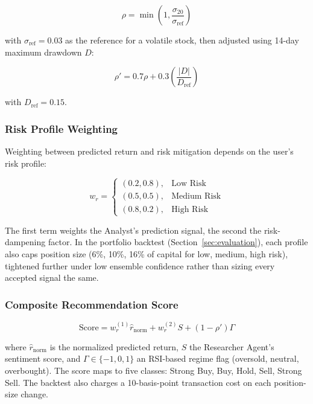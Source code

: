 \documentclass[conference]{IEEEtran}
\begin{document}
\begin{equation}
\rho = \min\left(1, \frac{\sigma_{20}}{\sigma_{\mathrm{ref}}}\right)
\end{equation}

with $\sigma_{\mathrm{ref}}=0.03$ as the reference for a volatile stock, then adjusted using 14-day maximum drawdown $D$:

\begin{equation}
\rho' = 0.7\rho + 0.3\left(\frac{|D|}{D_{\mathrm{ref}}}\right)
\end{equation}

with $D_{\mathrm{ref}}=0.15$.

\subsubsection{Risk Profile Weighting}

Weighting between predicted return and risk mitigation depends on the user's risk profile:

\[
w_r =
\begin{cases}
(0.2, 0.8), & \text{Low Risk} \\
(0.5, 0.5), & \text{Medium Risk} \\
(0.8, 0.2), & \text{High Risk}
\end{cases}
\]

The first term weights the Analyst's prediction signal, the second the risk-dampening factor. In the portfolio backtest (Section~\ref{sec:evaluation}), each profile also caps position size (6\%, 10\%, 16\% of capital for low, medium, high risk), tightened further under low ensemble confidence rather than sizing every accepted signal the same.

\subsubsection{Composite Recommendation Score}

\begin{equation}
\label{eq:final}
\mathrm{Score} = w_r^{(1)} \hat{r}_{\mathrm{norm}} + w_r^{(2)} S + (1-\rho')\Gamma
\end{equation}

where $\hat{r}_{\mathrm{norm}}$ is the normalized predicted return, $S$ the Researcher Agent's sentiment score, and $\Gamma \in \{-1,0,1\}$ an RSI-based regime flag (oversold, neutral, overbought). The score maps to five classes: Strong Buy, Buy, Hold, Sell, Strong Sell. The backtest also charges a 10-basis-point transaction cost on each position-size change.
\end{document}
